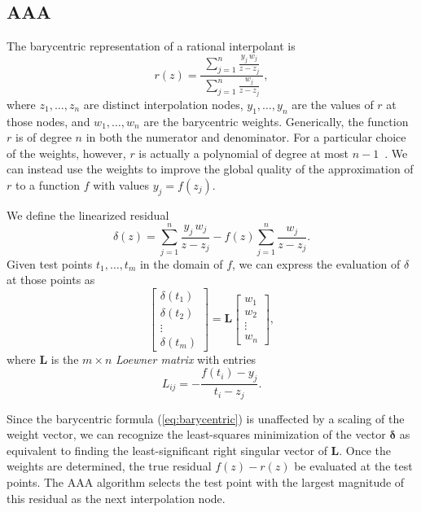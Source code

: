 \documentclass{juliacon}
\begin{document}
\subsection{AAA}
\label{sec:aaa}

The barycentric representation of a rational interpolant is
\begin{equation}
    \label{eq:barycentric}
    r(z) = \frac{ \; \displaystyle \sum_{j=1}^n \frac{y_j\, w_j}{z - z_j} \; }{ \displaystyle \sum_{j=1}^n \frac{w_j}{z - z_j} },
\end{equation}
where $z_1, \ldots, z_n$ are distinct interpolation nodes, $y_1, \ldots, y_n$ are the values of $r$ at those nodes, and $w_1, \ldots, w_n$ are the barycentric weights. Generically, the function $r$ is of degree $n$ in both the numerator and denominator. For a particular choice of the weights, however, $r$ is actually a polynomial of degree at most $n-1$~\cite{berrutBarycentricLagrange2004}. We can instead use the weights to improve the global quality of the approximation of $r$ to a function $f$ with values $y_j = f(z_j)$.

We define the linearized residual
\begin{equation}
    \label{eq:residual}
    \delta(z) = \sum_{j=1}^n \frac{y_j\, w_j}{z - z_j} - f(z) \sum_{j=1}^n \frac{w_j}{z - z_j}.
\end{equation}
Given test points $t_1, \ldots, t_m$ in the domain of $f$, we can express the evaluation of $\delta$ at those points as
\begin{equation}
    \label{eq:residuals}
    \begin{bmatrix} \delta(t_1) \\ \delta(t_2) \\ \vdots \\ \delta(t_m) \end{bmatrix} = \bm{L} \begin{bmatrix} w_1 \\ w_2 \\ \vdots \\ w_n \end{bmatrix},
\end{equation}
where $\bm{L}$ is the $m \times n$ \emph{Loewner matrix} with entries
\begin{equation}
    \label{eq:loewner}
    L_{ij} = - \frac{f(t_i) - y_j}{t_i - z_j}.
\end{equation}

Since the barycentric formula (\ref{eq:barycentric}) is unaffected by a scaling of the weight vector, we can recognize the least-squares minimization of the vector $\bm{\delta}$ as equivalent to finding the least-significant right singular vector of $\bm{L}$. Once the weights are determined, the true residual $f(z) - r(z)$ be evaluated at the test points. The AAA algorithm selects the test point with the largest magnitude of this residual as the next interpolation node.
\end{document}
